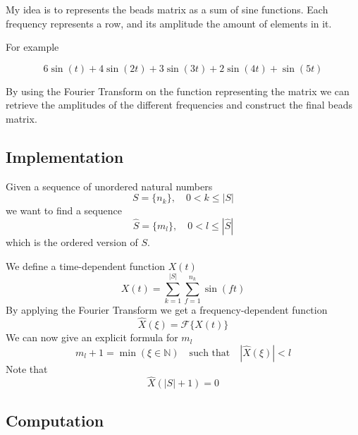\documentclass{article}
\begin{document}
My idea is to represents the beads matrix as a
sum of sine functions. Each frequency represents a row,
and its amplitude the amount of elements in it.

For example

\begin{minipage}{0.3\textwidth}
    \begin{flushright}        
    \end{flushright}
\end{minipage}
\begin{minipage}{0.5\textwidth}
    \[
        6\sin(t) + 4\sin(2t) + 3\sin(3t) + 2\sin(4t)+\sin(5t)
    \]
\end{minipage}

By using the Fourier Transform on the function representing the matrix
we can retrieve the amplitudes of the different frequencies
and construct the final beads matrix.

\subsection{Implementation}

Given a sequence of unordered natural numbers
\[
    S=\{n_k\},
    \quad
    0 < k \leq |S|
\]
we want to find a sequence
\[
    \hat{S}=\{m_l\},
    \quad
    0 < l \leq |\hat{S}|
\]
which is the ordered version of \(S\).

We define a time-dependent function \(X(t)\)
\[
    X(t)=
    \sum_{k=1}^{|S|}
    \sum_{f=1}^{n_k}
    \sin(ft)
\]
By applying the Fourier Transform we get a frequency-dependent function
\[
    \hat{X}(\xi)=\mathcal{F}\{X(t)\}
\]
We can now give an explicit formula for \(m_l\)
\[
    m_l + 1 = \min(\xi \in \mathbb{N})
    \quad
    \text{such that}
    \quad
    |\hat{X}(\xi)| < l
\]
Note that
\[
    \hat{X}(|S|+1)=0
\]

\pagebreak

\subsection{Computation}
\end{document}
